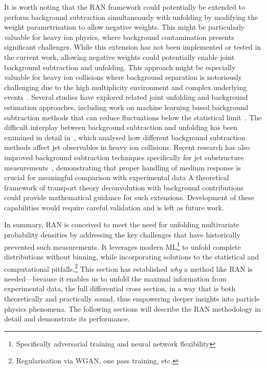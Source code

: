{{        It is worth noting that the RAN framework could potentially be extended to perform background subtraction simultaneously with unfolding by modifying the weight parametrisation to allow negative weights.
        This might be particularly valuable for heavy ion physics, where background contamination presents significant challenges.
        While this extension has not been implemented or tested in the current work, allowing negative weights could potentially enable joint background subtraction and unfolding.
            This approach might be especially valuable for heavy ion collisions where background separation is notoriously challenging due to the high multiplicity environment and complex underlying events~\cite{Mengel:2024fcl}.
            Several studies have explored related joint unfolding and background estimation approaches, including work on machine learning based background subtraction methods that can reduce fluctuations below the statistical limit~\cite{Haake:2018hqn, Do_2023, Mengel:2024fcl}.
            The difficult interplay between background subtraction and unfolding has been examined in detail in~\cite{Apolinario:2012cg}, which analysed how different background subtraction methods affect jet observables in heavy ion collisions.
            Recent research has also improved background subtraction techniques specifically for jet substructure measurements~\cite{Milhano:2022kzx}, demonstrating that proper handling of medium response is crucial for meaningful comparison with experimental data
            A theoretical framework of transport theory deconvolution with background contributions could provide mathematical guidance for such extensions.
            Development of these capabilities would require careful validation and is left as future work.

        In summary, RAN is conceived to meet the need for unfolding multivariate probability densities by addressing the key challenges that have historically prevented such measurements.
        It leverages modern ML\footnote{Specifically adversarial training and neural network flexibility} to unfold complete distributions without binning, while incorporating solutions to the statistical and computational pitfalls.\footnote{Regularisation via WGAN, one pass training, etc.}
        This section has established \emph{why} a method like RAN is needed---because it enables us to unfold the maximal information from experimental data, the full differential cross section, in a way that is both theoretically and practically sound, thus empowering deeper insights into particle physics phenomena.
        The following sections will describe the RAN methodology in detail and demonstrate its performance.

}}

